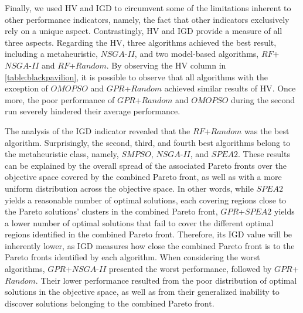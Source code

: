 Finally, we used \ac{HV} and \ac{IGD} to circumvent some of the limitations inherent to other performance indicators, namely, the fact that other indicators exclusively rely on a unique aspect. Contrastingly, \ac{HV} and \ac{IGD} provide a measure of all three aspects. Regarding the \ac{HV}, three algorithms achieved the best result, including a metaheuristic, $NSGA$-$II$, and two model-based algorithms, $RF$+$NSGA$-$II$ and $RF$+$Random$. By observing the \ac{HV} column in \cref{table:blackpavilion}, it is possible to observe that all algorithms with the exception of $OMOPSO$ and $GPR$+$Random$ achieved similar results of \ac{HV}. Once more, the poor performance of $GPR$+$Random$ and $OMOPSO$ during the second run severely hindered their average performance.

The analysis of the \ac{IGD} indicator revealed that the $RF$+$Random$ was the best algorithm. Surprisingly, the second, third, and fourth best algorithms belong to the metaheuristic class, namely, $SMPSO$, $NSGA$-$II$, and $SPEA2$. These results can be explained by the overall spread of the associated Pareto fronts over the objective space covered by the combined Pareto front, as well as with a more uniform distribution across the objective space. In other words, while $SPEA2$ yields a reasonable number of optimal solutions, each covering regions close to the Pareto solutions' clusters in the combined Pareto front, $GPR$+$SPEA2$ yields a lower number of optimal solutions that fail to cover the different optimal regions identified in the combined Pareto front. Therefore, its \ac{IGD} value will be inherently lower, as \ac{IGD} measures how close the combined Pareto front is to the Pareto fronts identified by each algorithm. When considering the worst algorithms, $GPR$+$NSGA$-$II$ presented the worst performance, followed by $GPR$+$Random$. Their lower performance resulted from the poor distribution of optimal solutions in the objective space, as well as from their generalized inability to discover solutions belonging to the combined Pareto front. 

